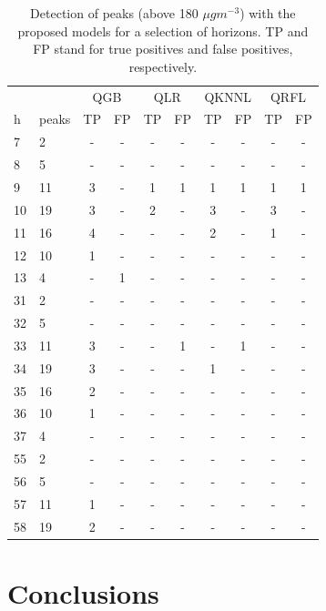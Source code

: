 \documentclass[a4paper,3p,sort&compress]{elsarticle}
\begin{document}
\begin{table}[tbp]
  \centering \footnotesize
  \caption{\label{table:classif_hig}
    Detection of \no peaks (above 180 $\mu gm^{-3}$) with the proposed
    models for a selection of horizons. TP and FP stand for true
    positives and false positives, respectively.
  }
  \begin{tabular}{llcccccccc}
    \toprule
    \multicolumn{2}{c}{} & \multicolumn{2}{c}{QGB} & \multicolumn{2}{c}{QLR} & \multicolumn{2}{c}{QKNNL} & \multicolumn{2}{c}{QRFL}   \\
    h & peaks &  TP &  FP &  TP &  FP &  TP &  FP &  TP &  FP\\
    \midrule
    7  & 2 &- &   - &- &   - &- & - &- &- \\
    8  & 5 &- &   - &- &   - &- & - &- &- \\
    9  &11 &3 &   - &1 &   1 &1 & 1 &1 &1 \\
    10 &19 &3 &   - &2 &   - &3 & - &3 &- \\
    11 &16 &4 &   - &- &   - &2 & - &1 &- \\
    12 &10 &1 &   - &- &   - &- & - &- &- \\
    13 & 4 &- &   1 &- &   - &- & - &- &- \\
    31 & 2 &- &   - &- &   - &- & - &- &- \\
    32 & 5 &- &   - &- &   - &- & - &- &- \\
    33 &11 &3 &   - &- &   1 &- & 1 &- &- \\
    34 &19 &3 &   - &- &   - &1 & - &- &- \\
    35 &16 &2 &   - &- &   - &- & - &- &- \\
    36 &10 &1 &   - &- &   - &- & - &- &- \\
    37 & 4 &- &   - &- &   - &- & - &- &- \\
    55 & 2 &- &   - &- &   - &- & - &- &- \\
    56 & 5 &- &   - &- &   - &- & - &- &- \\
    57 &11 &1 &   - &- &   - &- & - &- &- \\
    58 &19 &2 &   - &- &   - &- & - &- &- \\
    \bottomrule
    \end{tabular}
\end{table}

\section{Conclusions}
\label{sec:concl}
\end{document}
